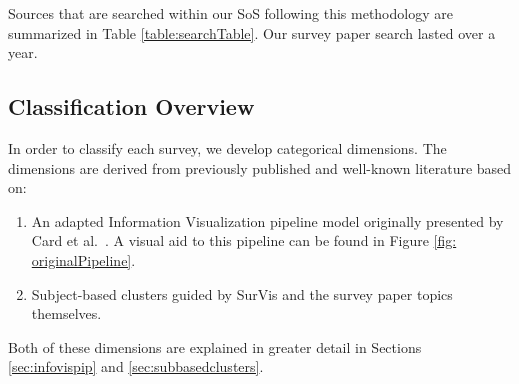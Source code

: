 Sources that are searched within our SoS following this methodology are summarized in Table \ref{table:searchTable}. Our survey paper search lasted over a year.


\subsection{Classification Overview}
In order to classify each survey, we develop categorical dimensions. The dimensions are derived from previously published and well-known literature based on: 
\begin{enumerate}
\item An adapted Information Visualization pipeline model originally presented by Card et al.\ \cite{card1999readings}. A visual aid to this pipeline can be found in Figure \ref{fig: originalPipeline}.
\item Subject-based clusters guided by SurVis \cite{beck2016visual} and the survey paper topics themselves.
\end{enumerate}
Both of these dimensions are explained in greater detail in Sections \ref{sec:infovispip} and \ref{sec:subbasedclusters}.

